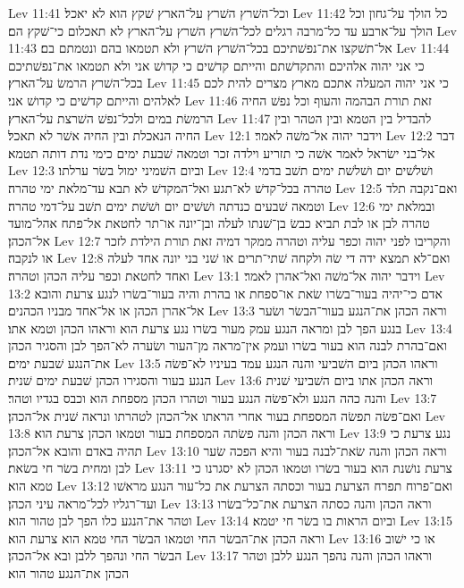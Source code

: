 Lev 11:41  וכל־השׁרץ השׁרץ על־הארץ שׁקץ הוא לא יאכל׃
Lev 11:42  כל הולך על־גחון וכל הולך על־ארבע עד כל־מרבה רגלים לכל־השׁרץ השׁרץ על־הארץ לא תאכלום כי־שׁקץ הם׃
Lev 11:43  אל־תשׁקצו את־נפשׁתיכם בכל־השׁרץ השׁרץ ולא תטמאו בהם ונטמתם בם׃
Lev 11:44  כי אני יהוה אלהיכם והתקדשׁתם והייתם קדשׁים כי קדושׁ אני ולא תטמאו את־נפשׁתיכם בכל־השׁרץ הרמשׂ על־הארץ׃
Lev 11:45  כי אני יהוה המעלה אתכם מארץ מצרים להית לכם לאלהים והייתם קדשׁים כי קדושׁ אני׃
Lev 11:46  זאת תורת הבהמה והעוף וכל נפשׁ החיה הרמשׂת במים ולכל־נפשׁ השׁרצת על־הארץ׃
Lev 11:47  להבדיל בין הטמא ובין הטהר ובין החיה הנאכלת ובין החיה אשׁר לא תאכל׃
Lev 12:1  וידבר יהוה אל־משׁה לאמר׃
Lev 12:2  דבר אל־בני ישׂראל לאמר אשׁה כי תזריע וילדה זכר וטמאה שׁבעת ימים כימי נדת דותה תטמא׃
Lev 12:3  וביום השׁמיני ימול בשׂר ערלתו׃
Lev 12:4  ושׁלשׁים יום ושׁלשׁת ימים תשׁב בדמי טהרה בכל־קדשׁ לא־תגע ואל־המקדשׁ לא תבא עד־מלאת ימי טהרה׃
Lev 12:5  ואם־נקבה תלד וטמאה שׁבעים כנדתה ושׁשׁים יום ושׁשׁת ימים תשׁב על־דמי טהרה׃
Lev 12:6  ובמלאת ימי טהרה לבן או לבת תביא כבשׂ בן־שׁנתו לעלה ובן־יונה או־תר לחטאת אל־פתח אהל־מועד אל־הכהן׃
Lev 12:7  והקריבו לפני יהוה וכפר עליה וטהרה ממקר דמיה זאת תורת הילדת לזכר או לנקבה׃
Lev 12:8  ואם־לא תמצא ידה די שׂה ולקחה שׁתי־תרים או שׁני בני יונה אחד לעלה ואחד לחטאת וכפר עליה הכהן וטהרה׃
Lev 13:1  וידבר יהוה אל־משׁה ואל־אהרן לאמר׃
Lev 13:2  אדם כי־יהיה בעור־בשׂרו שׂאת או־ספחת או בהרת והיה בעור־בשׂרו לנגע צרעת והובא אל־אהרן הכהן או אל־אחד מבניו הכהנים׃
Lev 13:3  וראה הכהן את־הנגע בעור־הבשׂר ושׂער בנגע הפך לבן ומראה הנגע עמק מעור בשׂרו נגע צרעת הוא וראהו הכהן וטמא אתו׃
Lev 13:4  ואם־בהרת לבנה הוא בעור בשׂרו ועמק אין־מראה מן־העור ושׂערה לא־הפך לבן והסגיר הכהן את־הנגע שׁבעת ימים׃
Lev 13:5  וראהו הכהן ביום השׁביעי והנה הנגע עמד בעיניו לא־פשׂה הנגע בעור והסגירו הכהן שׁבעת ימים שׁנית׃
Lev 13:6  וראה הכהן אתו ביום השׁביעי שׁנית והנה כהה הנגע ולא־פשׂה הנגע בעור וטהרו הכהן מספחת הוא וכבס בגדיו וטהר׃
Lev 13:7  ואם־פשׂה תפשׂה המספחת בעור אחרי הראתו אל־הכהן לטהרתו ונראה שׁנית אל־הכהן׃
Lev 13:8  וראה הכהן והנה פשׂתה המספחת בעור וטמאו הכהן צרעת הוא׃
Lev 13:9  נגע צרעת כי תהיה באדם והובא אל־הכהן׃
Lev 13:10  וראה הכהן והנה שׂאת־לבנה בעור והיא הפכה שׂער לבן ומחית בשׂר חי בשׂאת׃
Lev 13:11  צרעת נושׁנת הוא בעור בשׂרו וטמאו הכהן לא יסגרנו כי טמא הוא׃
Lev 13:12  ואם־פרוח תפרח הצרעת בעור וכסתה הצרעת את כל־עור הנגע מראשׁו ועד־רגליו לכל־מראה עיני הכהן׃
Lev 13:13  וראה הכהן והנה כסתה הצרעת את־כל־בשׂרו וטהר את־הנגע כלו הפך לבן טהור הוא׃
Lev 13:14  וביום הראות בו בשׂר חי יטמא׃
Lev 13:15  וראה הכהן את־הבשׂר החי וטמאו הבשׂר החי טמא הוא צרעת הוא׃
Lev 13:16  או כי ישׁוב הבשׂר החי ונהפך ללבן ובא אל־הכהן׃
Lev 13:17  וראהו הכהן והנה נהפך הנגע ללבן וטהר הכהן את־הנגע טהור הוא׃
